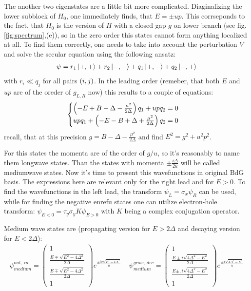 The another two eigenstates are a little bit more complicated. Diaginalizing  the lower subblock of $ H_0 $, one immediately finds, that $ E=\pm up $. This corrseponds to the fact, that $ H_0 $ is the version of $ H $ with a closed gap $ g $  on lower branch (see fig. \ref{fig:spectrum},(e)), so in the zero order this states cannot form anything localized at all. To find them correctly, one needs to take into account the perturbation $ V $ and solve the secular equation using the following ansatz:
\begin{gather}
	\psi = r_1\ket{+, + }+r_2\ket{-, - }+q_{1}\ket{+, - }+q_{2}\ket{-, + }
\end{gather}
with $ r_i\ll q_j $ for all  pairs $ \left(i,j\right) $. In the leading order (remeber, that both $ E  $ and $ up $ are of the oreder of $ g_{L,R} $ now) this results to a couple of equations:
\begin{gather}
\begin{cases}
	\left(-E+B-\Delta-\frac{\mu^2}{2\Delta}\right)q_1+up q_2=0
	\\
	u p q_1 + \left(-E-B+\Delta+\frac{\mu^2}{2\Delta}\right)q_2 =0
\end{cases}
\end{gather}
recall, that at this precision $ g=B-\Delta-\frac{\mu^2}{2\Delta} $ and find $ E^2=g^2+u^2p^2 $.

For this states the momenta are of the order of $ g/u $, so it's reasonably to name them longwave states. Than the states with momenta $ \pm\frac{i\Delta}{2u} $ will be called mediumwave states.
Now it's time to present this wavefunctions in original BdG basis. The expressions here are relevant only for the right lead and for $ E>0 $. To find the wavefunctions in the left lead, the transform $ \psi_L=\sigma_x\psi_R $ can be used, while for finding the negative enrefu states one can utilize electron-hole transform: $ \psi_{E<0}= \tau_y\sigma_yK\psi_{E>0}$ with $ K $ being a complex conjugation operator.

Medium wave states are (propagating version for $ E>2\Delta $ and decaying version for $ E<2\Delta $):
\begin{gather}
	\psi^{out,~in}_{medium}=
	\begin{pmatrix}
	1
	\\
	\frac{E\mp\sqrt{E^2-4\Delta^2}}{2\Delta}
	\\
	\frac{E\mp\sqrt{E^2-4\Delta^2}}{2\Delta}
	\\
	1
	\end{pmatrix}
	e^\frac{\pm i x\sqrt{E^2-4\Delta^2}}{u}
	~~~~~
	\psi^{grow,~dec}_{medium}=
	\begin{pmatrix}
	1
	\\
	\frac{E\pm i\sqrt{4\Delta^2-E^2}}{2\Delta}
	\\
	\frac{E\pm, i\sqrt{4\Delta^2-E^2}}{2\Delta}
	\\
	1
	\end{pmatrix}
	e^\frac{\pm  x\sqrt{4\Delta^2-E^2}}{u}
\end{gather}

